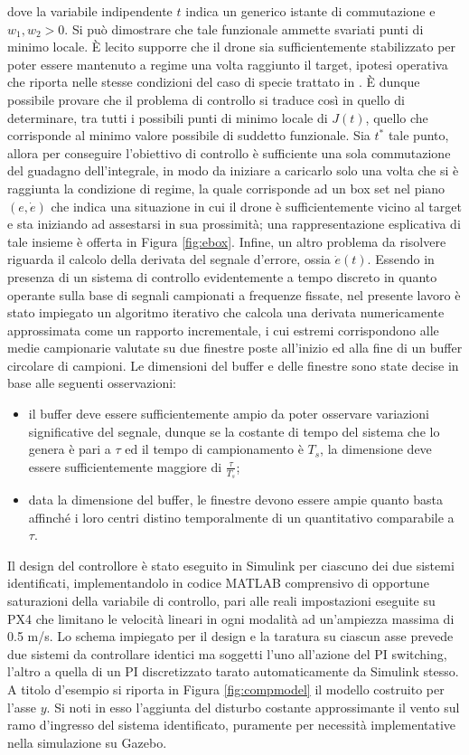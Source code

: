 dove la variabile indipendente $t$ indica un generico istante di commutazione e $w_1, w_2 > 0$. Si può dimostrare che tale funzionale ammette svariati punti di minimo locale. È lecito supporre che il drone sia sufficientemente stabilizzato per poter essere mantenuto a regime una volta raggiunto il target, ipotesi operativa che riporta nelle stesse condizioni del caso di specie trattato in \cite{pisw}. È dunque possibile provare che il problema di controllo si traduce così in quello di determinare, tra tutti i possibili punti di minimo locale di $J(t)$, quello che corrisponde al minimo valore possibile di suddetto funzionale. Sia $t^*$ tale punto, allora per conseguire l'obiettivo di controllo è sufficiente una sola commutazione del guadagno dell'integrale, in modo da iniziare a caricarlo solo una volta che si è raggiunta la condizione di regime, la quale corrisponde ad un box set nel piano $(e, \dot{e})$ che indica una situazione in cui il drone è sufficientemente vicino al target e sta iniziando ad assestarsi in sua prossimità; una rappresentazione esplicativa di tale insieme è offerta in Figura \ref{fig:ebox}. Infine, un altro problema da risolvere riguarda il calcolo della derivata del segnale d'errore, ossia $\dot{e}(t)$. Essendo in presenza di un sistema di controllo evidentemente a tempo discreto in quanto operante sulla base di segnali campionati a frequenze fissate, nel presente lavoro è stato impiegato un algoritmo iterativo che calcola una derivata numericamente approssimata come un rapporto incrementale, i cui estremi corrispondono alle medie campionarie valutate su due finestre poste all'inizio ed alla fine di un buffer circolare di campioni. Le dimensioni del buffer e delle finestre sono state decise in base alle seguenti osservazioni:
\begin{itemize}
    \item il buffer deve essere sufficientemente ampio da poter osservare variazioni significative del segnale, dunque se la costante di tempo del sistema che lo genera è pari a $\tau$ ed il tempo di campionamento è $T_s$, la dimensione deve essere sufficientemente maggiore di $\frac{\tau}{T_s}$;
    \item data la dimensione del buffer, le finestre devono essere ampie quanto basta affinché i loro centri distino temporalmente di un quantitativo comparabile a $\tau$.
\end{itemize}
Il design del controllore è stato eseguito in Simulink per ciascuno dei due sistemi identificati, implementandolo in codice MATLAB comprensivo di opportune saturazioni della variabile di controllo, pari alle reali impostazioni eseguite su PX4 che limitano le velocità lineari in ogni modalità ad un'ampiezza massima di 0.5 m/s. Lo schema impiegato per il design e la taratura su ciascun asse prevede due sistemi da controllare identici ma soggetti l'uno all'azione del PI switching, l'altro a quella di un PI discretizzato tarato automaticamente da Simulink stesso. A titolo d'esempio si riporta in Figura \ref{fig:compmodel} il modello costruito per l'asse $y$. Si noti in esso l'aggiunta del disturbo costante approssimante il vento sul ramo d'ingresso del sistema identificato, puramente per necessità implementative nella simulazione su Gazebo.\\
